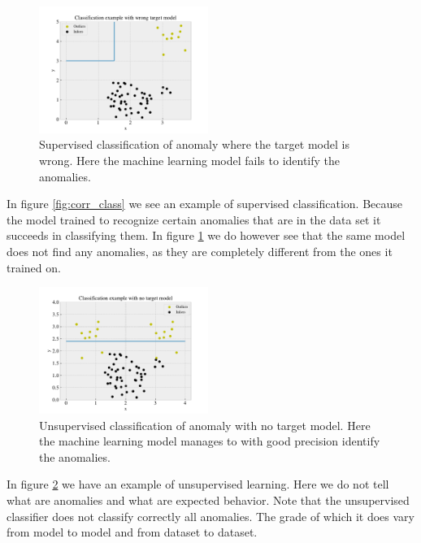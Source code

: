 \documentclass[ reprint, amsmath,amssymb, aps, nofootinbib]{revtex4-2}
\begin{document}
\begin{figure}[H]
    \centering
    \includegraphics[width=0.49\textwidth]{figures/theory/wrong_class.pdf}
    \caption{Supervised classification of anomaly where the target model is wrong. Here the machine learning model fails to identify the anomalies. }
    \label{fig:wrong_class}
\end{figure}

In figure \ref{fig:corr_class} we see an example of supervised classification. Because the model trained to recognize certain anomalies that are in the data set it succeeds in classifying them. In figure \ref{fig:wrong_class} we do however see that the same model does not find any anomalies, as they are completely different from the ones it trained on. 

\begin{figure}[H]
    \centering
    \includegraphics[width=0.49\textwidth]{figures/theory/unsuper.pdf}
    \caption{Unsupervised classification of anomaly with no target model. Here the machine learning model manages to with good precision identify the anomalies. }
    \label{fig:unsup_class}
\end{figure}

In figure \ref{fig:unsup_class} we have an example of unsupervised learning. Here we do not tell what are anomalies and what are expected behavior. Note that the unsupervised classifier does not classify correctly all anomalies. 
The grade of which it does vary from model to model and from dataset to dataset. \par \par 
\end{document}
